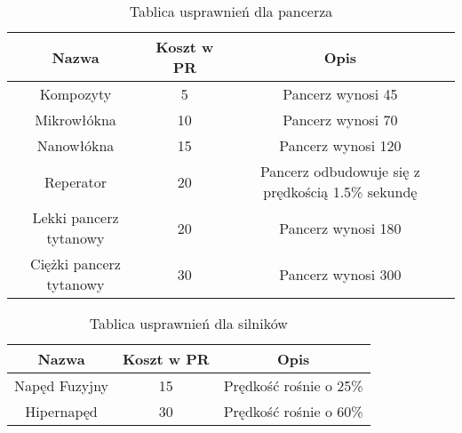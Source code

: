 \begin{table}[h]
\centering
\begin{tabular}{ | c | c | c | }
\hline
\textbf{Nazwa} & \textbf{Koszt w PR} & \textbf{Opis} \\
\hline
Kompozyty & 5 & Pancerz wynosi 45 \\ \hline
Mikrowłókna & 10 & Pancerz  wynosi 70 \\ \hline
Nanowłókna & 15 & Pancerz wynosi 120 \\ \hline
Reperator & 20 & Pancerz odbudowuje się z prędkością 1.5\% sekundę \\ \hline
Lekki pancerz tytanowy & 20 & Pancerz wynosi 180 \\ \hline
Ciężki pancerz tytanowy & 30 & Pancerz wynosi 300 \\ \hline
\end{tabular}
\caption{Tablica usprawnień dla pancerza}
\end{table}

\begin{table}[h]
\centering
\begin{tabular}{ | c | c | c | }
\hline
\textbf{Nazwa} & \textbf{Koszt w PR} & \textbf{Opis} \\
\hline
Napęd Fuzyjny & 15 & Prędkość rośnie o 25\% \\ \hline
Hipernapęd & 30 & Prędkość rośnie o 60\% \\ \hline
\end{tabular}
\caption{Tablica usprawnień dla silników}
\end{table}
